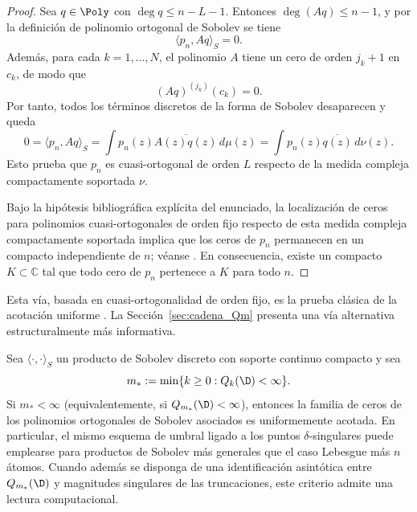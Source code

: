 \begin{proof}
	Sea $q \in \Poly$ con $\deg q \le n-L-1$. Entonces $\deg(Aq) \le n-1$, y por la definición de polinomio ortogonal de Sobolev se tiene
	\[
		\langle p_n, Aq \rangle_S = 0.
	\]
	Además, para cada $k=1,\dots,N$, el polinomio $A$ tiene un cero de orden $j_k+1$ en $c_k$, de modo que
	\[
		(Aq)^{(j_k)}(c_k)=0.
	\]
	Por tanto, todos los términos discretos de la forma de Sobolev desaparecen y queda
	\[
		0 = \langle p_n, Aq \rangle_S = \int p_n(z)\overline{A(z)q(z)}\,d\mu(z) = \int p_n(z)\overline{q(z)}\,d\nu(z).
	\]
	Esto prueba que $p_n$ es cuasi-ortogonal de orden $L$ respecto de la medida compleja compactamente soportada $\nu$.

	Bajo la hipótesis bibliográfica explícita del enunciado, la localización de ceros para polinomios cuasi-ortogonales de orden fijo respecto de esta medida compleja compactamente soportada implica que los ceros de $p_n$ permanecen en un compacto independiente de $n$; véanse \cite{lopez1999zero,lopez2001sobolev,marcellan2015sobolev}. En consecuencia, existe un compacto $K \subset \mathbb{C}$ tal que todo cero de $p_n$ pertenece a $K$ para todo $n$.
\end{proof}

\begin{rmk}\label{rem:via_clasica}
	Esta vía, basada en cuasi-ortogonalidad de orden fijo, es la prueba clásica de la acotación uniforme \cite{lopez1999zero,marcellan2015sobolev}. La Sección~\ref{sec:cadena_Qm} presenta una vía alternativa estructuralmente más informativa.
\end{rmk}

\begin{rmk}\label{prop:marco_generalizacion_umbral_singular}
	Sea $\langle\cdot,\cdot\rangle_S$ un producto de Sobolev discreto con soporte continuo compacto y sea
	\[
		m_*:=\min\{k\ge 0: Q_k(\D)<\infty\}.
	\]
	Si $m_*<\infty$ (equivalentemente, si $Q_{m_*}(\D)<\infty$),
	entonces la familia de ceros de los polinomios ortogonales de Sobolev asociados es uniformemente acotada.
	En particular, el mismo esquema de umbral ligado a los puntos $\delta$-singulares puede emplearse para productos de Sobolev más generales que el caso Lebesgue más $n$ átomos.
	Cuando además se disponga de una identificación asintótica entre $Q_{m_*}(\D)$ y magnitudes singulares de las truncaciones, este criterio admite una lectura computacional.
\end{rmk}

